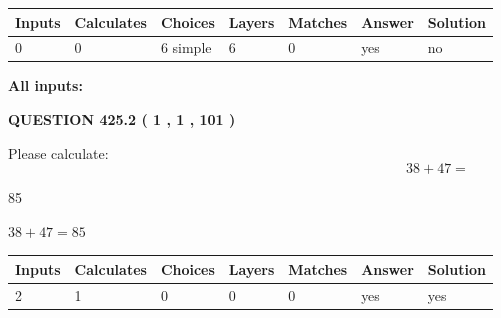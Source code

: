 \documentclass[12pt]{article}
\begin{document}
 
   
   
   
   
\noindent\begin{tabular}{|l|l|l|l|l|l|l|}
 \hline
Inputs & Calculates & Choices & Layers & Matches & Answer & Solution \\ \hline
 0  & 
 0  & 
 6
  simple  
  & 
 6  & 
 0  & 
  yes & 
  no 
  \\ \hline
 \end{tabular}
   
   
   
   
\noindent{}
   
   
   
   
\noindent\vspace{0.1in}\hspace{-0.08in} {\textbf{\Large{All inputs: }}}
   
   
  
\vspace{0.2in}
  
{\textbf{\Large{QUESTION
425.2 
 ( 1 , 1 , 101 )
}}}
  
  
 
Please calculate:
\begin{equation}
38 +  %
47 = \nonumber
\end{equation}
 
 
 
\noindent{}
 
 

85
 
 
\noindent{}
 
 

 
 
 
\noindent{}
 
 

$ %
38 +  %
47=   %
85$
 
 
\noindent{}
 
 

 
   
   
   
   
\noindent\begin{tabular}{|l|l|l|l|l|l|l|}
 \hline
Inputs & Calculates & Choices & Layers & Matches & Answer & Solution \\ \hline
 2  & 
 1  & 
 0
  & 
 0  & 
 0  & 
  yes & 
  yes 
  \\ \hline
 \end{tabular}
   
\end{document}
